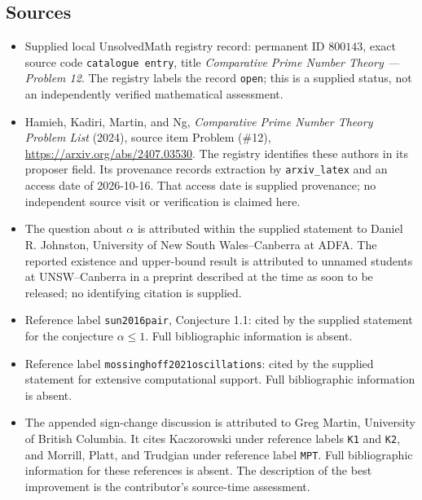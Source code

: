 \documentclass[11pt]{article}
\begin{document}
\subsection{Sources}
\begin{itemize}
\item Supplied local UnsolvedMath registry record: permanent ID \(800143\), exact source code \texttt{catalogue entry}, title \emph{Comparative Prime Number Theory --- Problem 12}. The registry labels the record \texttt{open}; this is a supplied status, not an independently verified mathematical assessment.
\item Hamieh, Kadiri, Martin, and Ng, \emph{Comparative Prime Number Theory Problem List} (2024), source item Problem (\#12), \url{https://arxiv.org/abs/2407.03530}. The registry identifies these authors in its proposer field. Its provenance records extraction by \texttt{arxiv\_latex} and an access date of 2026-10-16. That access date is supplied provenance; no independent source visit or verification is claimed here.
\item The question about \(\alpha\) is attributed within the supplied statement to Daniel R. Johnston, University of New South Wales--Canberra at ADFA. The reported existence and upper-bound result is attributed to unnamed students at UNSW--Canberra in a preprint described at the time as soon to be released; no identifying citation is supplied.
\item Reference label \texttt{sun2016pair}, Conjecture 1.1: cited by the supplied statement for the conjecture \(\alpha\leq 1\). Full bibliographic information is absent.
\item Reference label \texttt{mossinghoff2021oscillations}: cited by the supplied statement for extensive computational support. Full bibliographic information is absent.
\item The appended sign-change discussion is attributed to Greg Martin, University of British Columbia. It cites Kaczorowski under reference labels \texttt{K1} and \texttt{K2}, and Morrill, Platt, and Trudgian under reference label \texttt{MPT}. Full bibliographic information for these references is absent. The description of the best improvement is the contributor's source-time assessment.
\end{itemize}
\end{document}
